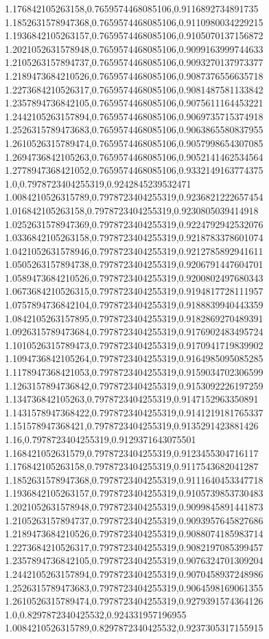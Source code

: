 1.176842105263158,0.7659574468085106,0.9116892734891735
1.1852631578947368,0.7659574468085106,0.9110980034229215
1.1936842105263157,0.7659574468085106,0.9105070137156872
1.2021052631578948,0.7659574468085106,0.9099163999744633
1.2105263157894737,0.7659574468085106,0.9093270137973377
1.2189473684210526,0.7659574468085106,0.9087376556635718
1.2273684210526317,0.7659574468085106,0.9081487581133842
1.2357894736842105,0.7659574468085106,0.9075611164453221
1.2442105263157894,0.7659574468085106,0.9069735715374918
1.2526315789473683,0.7659574468085106,0.9063865580837955
1.2610526315789474,0.7659574468085106,0.9057998654307085
1.2694736842105263,0.7659574468085106,0.9052141462534564
1.2778947368421052,0.7659574468085106,0.9332149163774375
1.0,0.7978723404255319,0.9242845239532471
1.0084210526315789,0.7978723404255319,0.9236821222657454
1.016842105263158,0.7978723404255319,0.9230805039414918
1.0252631578947369,0.7978723404255319,0.9224792942532076
1.0336842105263158,0.7978723404255319,0.9218783378601074
1.0421052631578946,0.7978723404255319,0.9212785892941611
1.0505263157894738,0.7978723404255319,0.9206791447604701
1.0589473684210526,0.7978723404255319,0.9200802497680343
1.0673684210526315,0.7978723404255319,0.9194817728111957
1.0757894736842104,0.7978723404255319,0.9188839940443359
1.0842105263157895,0.7978723404255319,0.9182869270489391
1.0926315789473684,0.7978723404255319,0.9176902483495724
1.1010526315789473,0.7978723404255319,0.9170941719839902
1.1094736842105264,0.7978723404255319,0.9164985095085285
1.1178947368421053,0.7978723404255319,0.9159034702306599
1.1263157894736842,0.7978723404255319,0.9153092226197259
1.134736842105263,0.7978723404255319,0.9147152963350891
1.1431578947368422,0.7978723404255319,0.9141219181765337
1.151578947368421,0.7978723404255319,0.9135291423881426
1.16,0.7978723404255319,0.9129371643075501
1.168421052631579,0.7978723404255319,0.9123455304716117
1.176842105263158,0.7978723404255319,0.9117543682041287
1.1852631578947368,0.7978723404255319,0.9111640453347718
1.1936842105263157,0.7978723404255319,0.9105739853730483
1.2021052631578948,0.7978723404255319,0.9099845891441873
1.2105263157894737,0.7978723404255319,0.9093957645827686
1.2189473684210526,0.7978723404255319,0.9088074185983714
1.2273684210526317,0.7978723404255319,0.9082197085399457
1.2357894736842105,0.7978723404255319,0.9076324701309204
1.2442105263157894,0.7978723404255319,0.9070458937248986
1.2526315789473683,0.7978723404255319,0.9064598169061355
1.2610526315789474,0.7978723404255319,0.9279391574364126
1.0,0.8297872340425532,0.924331957196955
1.0084210526315789,0.8297872340425532,0.9237305317155915
